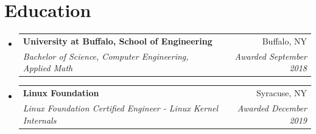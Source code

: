 \documentclass[letterpaper,11pt]{article}
\makeatletter
\newcommand{\resumeSubheading}[4]{
	\vspace{-1pt}\item
	\begin{tabular*}{0.97\textwidth}{l@{\extracolsep{\fill}}r}
		\textbf{#1} & #2 \\
		\textit{\small#3} & \textit{\small #4} \\
	\end{tabular*}\vspace{-5pt}
}
\newcommand{\resumeSubHeadingListStart}{\begin{itemize}[leftmargin=*]}
\newcommand{\resumeSubHeadingListEnd}{\end{itemize}}
\makeatother
\begin{document}
	\section{Education}
	\resumeSubHeadingListStart
	\resumeSubheading
	{University at Buffalo, School of Engineering}{Buffalo, NY}
	{Bachelor of Science, Computer Engineering, Applied Math}{Awarded September 2018}
	\resumeSubheading
	{Linux Foundation}{Syracuse, NY}
	{Linux Foundation Certified Engineer - Linux Kernel Internals}{Awarded December 2019}
	\resumeSubHeadingListEnd
	
	
	
	
\end{document}
